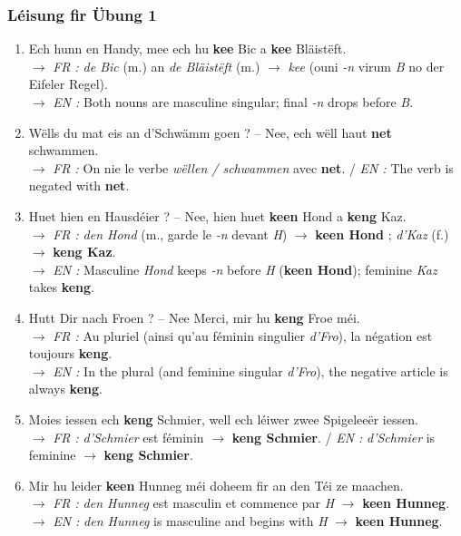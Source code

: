 \subsubsection*{Léisung fir Übung 1}
\begin{enumerate}
    \item Ech hunn en Handy, mee ech hu \textbf{kee} Bic a \textbf{kee} Bläistëft. \\
    $\rightarrow$ \textit{FR :} \textit{de Bic} (m.) an \textit{de Bläistëft} (m.) $\rightarrow$ \textit{kee} (ouni \textit{-n} virum \textit{B} no der Eifeler Regel). \\
    $\rightarrow$ \textit{EN :} Both nouns are masculine singular; final \textit{-n} drops before \textit{B}.
    \item Wëlls du mat eis an d'Schwämm goen ? -- Nee, ech wëll haut \textbf{net} schwammen. \\
    $\rightarrow$ \textit{FR :} On nie le verbe \textit{wëllen / schwammen} avec \textbf{net}. / \textit{EN :} The verb is negated with \textbf{net}.
    \item Huet hien en Hausdéier ? -- Nee, hien huet \textbf{keen} Hond a \textbf{keng} Kaz. \\
    $\rightarrow$ \textit{FR :} \textit{den Hond} (m., garde le \textit{-n} devant \textit{H}) $\rightarrow$ \textbf{keen Hond} ; \textit{d'Kaz} (f.) $\rightarrow$ \textbf{keng Kaz}. \\
    $\rightarrow$ \textit{EN :} Masculine \textit{Hond} keeps \textit{-n} before \textit{H} (\textbf{keen Hond}); feminine \textit{Kaz} takes \textbf{keng}.
    \item Hutt Dir nach Froen ? -- Nee Merci, mir hu \textbf{keng} Froe méi. \\
    $\rightarrow$ \textit{FR :} Au pluriel (ainsi qu'au féminin singulier \textit{d'Fro}), la négation est toujours \textbf{keng}. \\
    $\rightarrow$ \textit{EN :} In the plural (and feminine singular \textit{d'Fro}), the negative article is always \textbf{keng}.
    \item Moies iessen ech \textbf{keng} Schmier, well ech léiwer zwee Spigeleeër iessen. \\
    $\rightarrow$ \textit{FR :} \textit{d'Schmier} est féminin $\rightarrow$ \textbf{keng Schmier}. / \textit{EN :} \textit{d'Schmier} is feminine $\rightarrow$ \textbf{keng Schmier}.
    \item Mir hu leider \textbf{keen} Hunneg méi doheem fir an den Téi ze maachen. \\
    $\rightarrow$ \textit{FR :} \textit{den Hunneg} est masculin et commence par \textit{H} $\rightarrow$ \textbf{keen Hunneg}. \\
    $\rightarrow$ \textit{EN :} \textit{den Hunneg} is masculine and begins with \textit{H} $\rightarrow$ \textbf{keen Hunneg}.
\end{enumerate}

